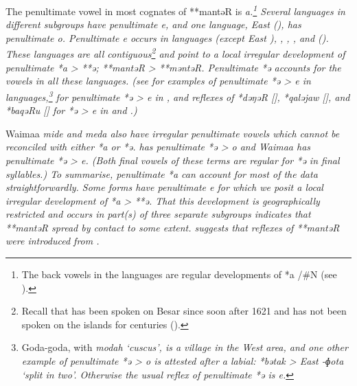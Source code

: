 The penultimate vowel in most cognates of **mantəR is \it{a}.\footnote{
		The back vowels in the  languages
		are regular developments of *a /{\#}N{\gap} (see {}).}
Several languages in different subgroups have penultimate \it{e},
and one language, East  (), has penultimate \it{o}.
Penultimate \it{e} occurs in  languages (except East ),
, , , and  ().
These languages are all contiguous\footnote{
		Recall that  has been spoken on  Besar since soon after 1621
		and has not been spoken on the  islands for centuries ().}
and point to a local irregular development of penultimate *a
> **ə; **mantəR > **məntəR.
Penultimate *ə accounts for the vowels in all these languages.
(see  for examples of penultimate *ə > \it{e} in 
languages,\footnote{
		Goda-goda, with \it{modah} ‘cuscus’, is a village in the West  area,
		and one other example of penultimate *ə > \it{o} is attested
		after a labial: *bətak > East  -\it{ɸota} ‘split in two’.
		Otherwise the usual reflex of penultimate *ə is \it{e}.}
 for penultimate *ə > \it{e} in ,
and reflexes of *dəŋəR [],
*qaləjaw [], and *baqəRu [] for *ə > \it{e}
in  and .) 

Waima{\Q}a \it{mide} and  \it{meda} also have irregular
penultimate vowels which cannot be reconciled with either *a or *ə.
 has penultimate *ə > \it{o}
and Waima{\Q}a has penultimate *ə > \it{e}.
(Both final vowels of these terms are regular for *ə in final
syllables.) 
To summarise, penultimate *a can account for most of the data straightforwardly.
Some forms have penultimate \it{e} for which we posit a local
irregular development of *a > **ə.
That this development is geographically restricted
and occurs in part(s) of three separate subgroups indicates that
**mantəR spread by contact to some extent.
\citet[264]{Schapper2011} suggests that  reflexes of **mantəR
were introduced from .